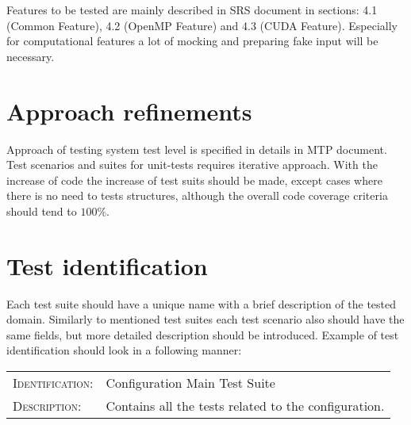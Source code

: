 	Features to be tested are mainly described in \gls{SRS} document in sections: 4.1 (Common Feature), 4.2 (OpenMP Feature) and 4.3 (CUDA Feature). Especially for computational features a lot of mocking and preparing fake input will be necessary.
\section{Approach refinements} \label{s:details-of-the-level-test-design:approach-refinements}
	\begin{comment}
		Specify refinements to the approach described in the corresponding Level Test Plan (if there is one;
		otherwise specify the entire approach). Include specific test techniques to be used. The method of
		analyzing test results should be identified (e.g., comparator tools, visual inspection, etc.).
		Summarize the common attributes of any test cases. This may include input constraints that must be
		true for every input in a set of associated test cases, any shared environmental needs, any shared
		special procedural requirements, and any shared case dependencies. Sets of associated test cases may
		be identified as scenarios (also commonly called scripts or suites). Test scenarios should be designed to
		be as reusable as possible for regression testing, revalidation testing for changes, and training new
		employees who must either use or support the system over time.
	\end{comment}
	Approach of testing system test level is specified in details in \gls{MTP} document. Test scenarios and suites for unit-tests requires iterative approach. With the increase of code the increase of test suits should be made, except cases where there is no need to tests structures, although the overall code coverage criteria should tend to $100\%$.
\section{Test identification} \label{s:details-of-the-level-test-design:test-identification}
	\begin{comment}
		List the identifier and a brief description of each test case (or set of related test cases) in scenarios for
		this design. A particular test case, scenario, or procedure may be identified in more than one LTD. List
		the identifier and a brief description of each procedure associated with this LTD.
	\end{comment}
	Each test suite should have a unique name with a brief description of the tested domain. Similarly to mentioned test suites each test scenario also should have the same fields, but more detailed description should be introduced. Example of test identification should look in a following manner: \\
	\begin{center}
		\boxed
		{
			\begin{tabular}{ll}
				\textsc{Identification:} & Configuration Main Test Suite \\
				\textsc{Description:} & Contains all the tests related to the configuration.
			\end{tabular}
		}
	\end{center}
